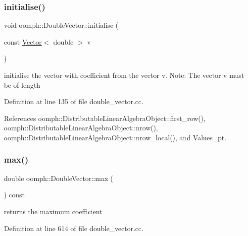 \mbox{\label{classoomph_1_1DoubleVector_ae3ce2b88e72d8b084e9be8e9af10c487}} 
\subsubsection{\texorpdfstring{initialise()}{initialise()}\hspace{0.1cm}{\footnotesize\ttfamily [2/2]}}
{\footnotesize\ttfamily void oomph\+::\+Double\+Vector\+::initialise (\begin{DoxyParamCaption}\item[{const \hyperlink{classoomph_1_1Vector}{Vector}$<$ double $>$}]{v }\end{DoxyParamCaption})}



initialise the vector with coefficient from the vector v. Note\+: The vector v must be of length 



Definition at line 135 of file double\+\_\+vector.\+cc.



References oomph\+::\+Distributable\+Linear\+Algebra\+Object\+::first\+\_\+row(), oomph\+::\+Distributable\+Linear\+Algebra\+Object\+::nrow(), oomph\+::\+Distributable\+Linear\+Algebra\+Object\+::nrow\+\_\+local(), and Values\+\_\+pt.

\mbox{\label{classoomph_1_1DoubleVector_a4c176b562f503701d65882a930d5b8f5}} 
\subsubsection{\texorpdfstring{max()}{max()}}
{\footnotesize\ttfamily double oomph\+::\+Double\+Vector\+::max (\begin{DoxyParamCaption}{ }\end{DoxyParamCaption}) const}



returns the maximum coefficient 



Definition at line 614 of file double\+\_\+vector.\+cc.



